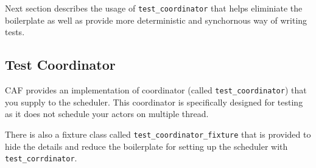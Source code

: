 Next section describes the usage of \lstinline^test_coordinator^ that helps eliminiate the boilerplate as well as provide more deterministic and synchornous way
of writing tests.

\subsection{Test Coordinator}

CAF provides an implementation of coordinator (called  \lstinline^test_coordinator^) that you supply to the scheduler. This coordinator is specifically designed 
for testing as it does not schedule your actors on multiple thread.

There is also a fixture class called \lstinline^test_coordinator_fixture^ that is provided to hide the details and reduce the boilerplate for setting up the scheduler 
with \lstinline^test_corrdinator^.

